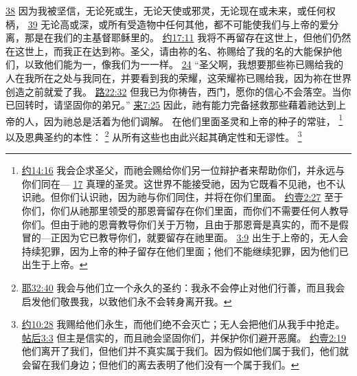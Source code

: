 \documentclass[12pt, a4paper, oneside]{ctexart}
\begin{document}
{		\href{https://biblehub.com/romans/8-38.htm}{38} 因为我被坚信，无论死或生，无论天使或邪灵，无论现在或未来，或任何权柄，
		\href{https://biblehub.com/romans/8-39.htm}{39} 无论高或深，或所有受造物中任何其他，都不可能使我们与上帝的爱分离，那是在我们的主基督耶稣里的。
		\href{https://biblehub.com/john/17-11.htm}{约17:11} 我将不再留存在这世上，但他们仍然在这世上，而我正在达到祢。圣父，请由祢的名、祢赐给了我的名的大能保护他们，以致他们能为一，像我们为一一样。
		\href{https://biblehub.com/john/17-24.htm}{24} “圣父啊，我想要那些祢已赐给我的人在我所在之处与我同在，并要看到我的荣耀，这荣耀祢已赐给我，因为祢在世界创造之前就爱了我。
		\href{https://biblehub.com/luke/22-32.htm}{路22:32} 但我已为你祷告，西门，愿你的信心不会落空。当你已回转时，请坚固你的弟兄。”
		\href{https://biblehub.com/hebrews/7-25.htm}{来7:25} 因此，祂有能力完备拯救那些藉着祂达到上帝的人，因为祂总是活着为他们调解。
	}
	在他们里面圣灵和上帝的种子的常驻，
	\footnote {
		\href{https://biblehub.com/john/14-16.htm}{约14:16} 我会企求圣父，而祂会赐给你们另一位辩护者来帮助你们，并永远与你们同在---
		\href{https://biblehub.com/john/14-17.htm}{17} 真理的圣灵。这世界不能接受祂，因为它既看不见祂，也不认识祂。但你们认识祂，因为祂与你们同住，并将在你们里面。
		\href{https://biblehub.com/1_john/2-27.htm}{约壹2:27} 至于你们，你们从祂那里领受的那恩膏留存在你们里面，而你们不需要任何人教导你们。但由于祂的恩膏教导你们关于万物，且由于那恩膏是真实的，而不是假冒的---正因为它已教导你们，就要留存在祂里面。
		\href{https://biblehub.com/1_john/3-9.htm}{3:9} 出生于上帝的，无人会持续犯罪，因为上帝的种子留存在他们里面；他们不能继续犯罪，因为他们已出生于上帝。
	}
	以及恩典圣约的本性：
	\footnote {
		\href{https://biblehub.com/jeremiah/32-40.htm}{耶32:40} 我会与他们立一个永久的圣约：我永不会停止对他们行善，而且我会启发他们敬畏我，以致他们永不会转身离开我。
	}
	从所有这些也由此兴起其确定性和无谬性。
	\footnote {
		\href{https://biblehub.com/john/10-28.htm}{约10:28} 我赐给他们永生，而他们绝不会灭亡；无人会把他们从我手中抢走。
		\href{https://biblehub.com/2_thessalonians/3-3.htm}{帖后3:3} 但主是信实的，而且祂会坚固你们，并保护你们避开恶魔。
		\href{https://biblehub.com/1_john/2-19.htm}{约壹2:19} 他们离开了我们，但他们并不真实属于我们。因为假如他们属于我们，他们就会留在我们身边；但他们的离去表明了他们没有一个属于我们。
	}
\end{document}
